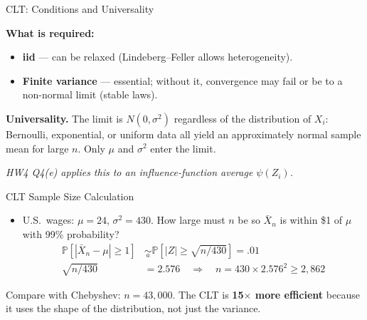 \documentclass[handout, aspectratio=169]{beamer}
\numberwithin{equation}{section}
\begin{document}
\begin{frame}{CLT: Conditions and Universality}

\textbf{What is required:}
\begin{itemize}
    \item \textbf{iid} --- can be relaxed (Lindeberg--Feller allows heterogeneity).
    \item \textbf{Finite variance} --- essential; without it, convergence may fail or be to a non-normal limit (stable laws).
\end{itemize}

\pause

\medskip

\textbf{Universality.} The limit is $N(0,\sigma^2)$ regardless of the distribution of $X_i$: Bernoulli, exponential, or uniform data all yield an approximately normal sample mean for large $n$. Only $\mu$ and $\sigma^2$ enter the limit.

\pause

\medskip

\textit{HW4 Q4(e) applies this to an influence-function average $\psi(Z_i)$.}

\end{frame}




\begin{frame}{CLT Sample Size Calculation}
\begin{itemize}
\item U.S.\ wages: $\mu=24$, $\sigma^2=430$. How large must $n$ be so $\bar{X}_n$ is within \$1 of $\mu$ with 99\% probability?
\begin{align*}
\mathbb{P}\!\left[ |\bar{X}_n-\mu|\geq 1\right] &\underset{a}{\sim} \mathbb{P}\!\left[ |Z|\geq \sqrt{n/430}\right]=.01\\
\sqrt{n/430}&=2.576 \quad\Rightarrow\quad n=430\times 2.576^2 \geq 2{,}862
\end{align*}
\end{itemize}

\pause

Compare with Chebyshev: $n = 43{,}000$. The CLT is \textbf{15$\times$ more efficient} because it uses the shape of the distribution, not just the variance.

\end{frame}
\end{document}

